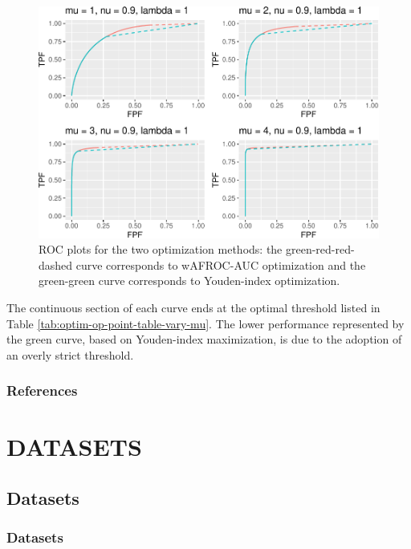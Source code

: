 \documentclass[
]{book}
\begin{document}
\begin{figure}
\centering
\includegraphics{21-optim-op-point_files/figure-latex/optim-op-point-vary-mu-roc-1.pdf}
\caption{\label{fig:optim-op-point-vary-mu-roc}ROC plots for the two optimization methods: the green-red-red-dashed curve corresponds to wAFROC-AUC optimization and the green-green curve corresponds to Youden-index optimization.}
\end{figure}

The continuous section of each curve ends at the optimal threshold listed in Table \ref{tab:optim-op-point-table-vary-mu}. The lower performance represented by the green curve, based on Youden-index maximization, is due to the adoption of an overly strict threshold.

\hypertarget{optim-op-point-references}{%
\section{References}\label{optim-op-point-references}}

\hypertarget{part-datasets}{%
\part*{DATASETS}\label{part-datasets}}

\hypertarget{datasets}{%
\chapter{Datasets}\label{datasets}}

\hypertarget{datasets-datasets}{%
\section{Datasets}\label{datasets-datasets}}
\end{document}

